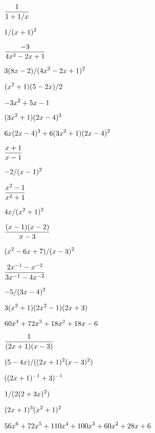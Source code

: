 \begin{exercises}
\exercise $\displaystyle {1\over 1+1/x}$
\begin{answer} $\displaystyle 1/(x+1)^2$
\end{answer}

\exercise $\displaystyle {-3\over 4x^2-2x+1}$
\begin{answer} $\displaystyle 3(8x-2)/(4x^2-2x+1)^2$
\end{answer}

\exercise $\displaystyle (x^2+1)(5-2x)/2$
\begin{answer} $\displaystyle -3x^2+5x-1$
\end{answer}

\exercise $\displaystyle (3x^2+1)(2x-4)^3$
\begin{answer} $\displaystyle 6x(2x-4)^3+6(3x^2+1)(2x-4)^2$
\end{answer}

\exercise $\displaystyle{x+1\over x-1}$
\begin{answer} $\displaystyle -2/(x-1)^2$
\end{answer}

\exercise $\displaystyle{x^2-1\over x^2+1}$
\begin{answer} $\displaystyle 4x/(x^2+1)^2$
\end{answer}

\exercise $\displaystyle{(x-1)(x-2)\over x-3}$
\begin{answer} $\displaystyle (x^2-6x+7)/(x-3)^2$
\end{answer}

\exercise $\displaystyle{2x^{-1}-x^{-2}\over 3x^{-1}-4x^{-2}}$
\begin{answer} $\displaystyle -5/(3x-4)^2$
\end{answer}

\exercise $\displaystyle 3(x^2+1)(2x^2-1)(2x+3)$
\begin{answer} $\displaystyle 60x^4+72x^3+18x^2+18x-6$
\end{answer}

\exercise $\displaystyle{1\over (2x+1)(x-3)}$
\begin{answer} $\displaystyle (5-4x)/((2x+1)^2(x-3)^2)$
\end{answer}

\exercise $\displaystyle ((2x+1)^{-1}+3)^{-1}$
\begin{answer} $\displaystyle 1/(2(2+3x)^2)$
\end{answer}

\exercise $\displaystyle (2x+1)^3(x^2+1)^2$
\begin{answer} $\displaystyle 56x^6+72x^5+110x^4+100x^3+60x^2+28x+6$
\end{answer}


\end{exercises}
